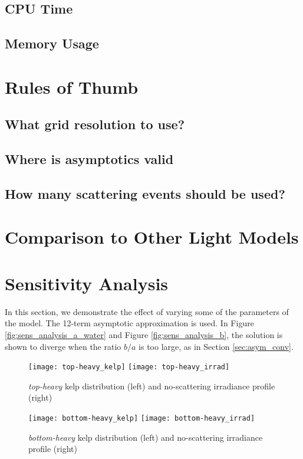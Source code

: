 \subsection{CPU Time}
\subsection{Memory Usage}

\section{Rules of Thumb}
\subsection{What grid resolution to use?}
\subsection{Where is asymptotics valid}
\subsection{How many scattering events should be used?}

\section{Comparison to Other Light Models}

\section{Sensitivity Analysis}
In this section, we demonstrate the effect of varying some of the parameters of the model.
The 12-term asymptotic approximation is used.
In Figure \ref{fig:sens_analysis_a_water} and Figure \ref{fig:sens_analysis_b}, the solution
is shown to diverge when the ratio $b/a$ is too large, as in Section \ref{sec:asym_conv}.

\begin{figure}[H]
  \centering
  \vspace{-3em}
  \texttt{[image: top-heavy\_kelp]}
  \texttt{[image: top-heavy\_irrad]}
  \caption{\textit{top-heavy} kelp distribution (left) and no-scattering irradiance profile (right)}
\end{figure}

\begin{figure}[H]
  \centering
  \vspace{-3em}
  \texttt{[image: bottom-heavy\_kelp]}
  \texttt{[image: bottom-heavy\_irrad]}
  \caption{\textit{bottom-heavy} kelp distribution (left) and no-scattering irradiance profile (right)}
\end{figure}


